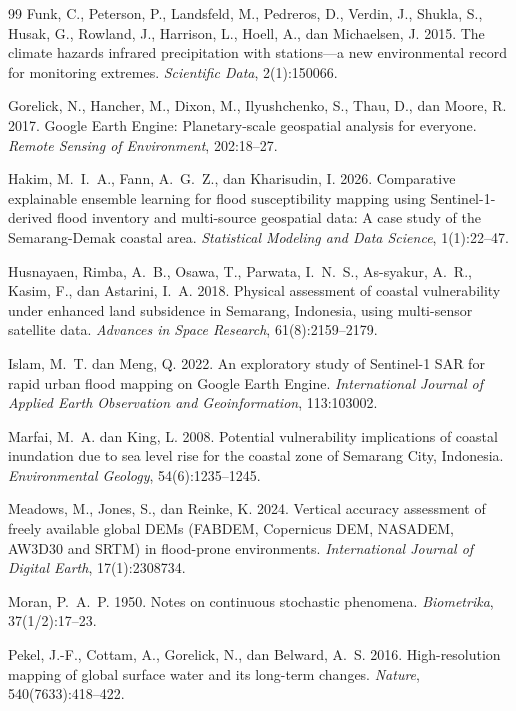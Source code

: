\documentclass[12pt,a4paper]{article}
\begin{document}
\begin{thebibliography}{99}
 Funk, C., Peterson, P., Landsfeld, M., Pedreros, D., Verdin, J., Shukla, S., Husak, G., Rowland, J., Harrison, L., Hoell, A., dan Michaelsen, J. 2015. The climate hazards infrared precipitation with stations---a new environmental record for monitoring extremes. \textit{Scientific Data}, 2(1):150066.

 Gorelick, N., Hancher, M., Dixon, M., Ilyushchenko, S., Thau, D., dan Moore, R. 2017. Google Earth Engine: Planetary-scale geospatial analysis for everyone. \textit{Remote Sensing of Environment}, 202:18--27.

 Hakim, M.~I.~A., Fann, A.~G.~Z., dan Kharisudin, I. 2026. Comparative explainable ensemble learning for flood susceptibility mapping using Sentinel-1-derived flood inventory and multi-source geospatial data: A case study of the Semarang-Demak coastal area. \textit{Statistical Modeling and Data Science}, 1(1):22--47.

 Husnayaen, Rimba, A.~B., Osawa, T., Parwata, I.~N.~S., As-syakur, A.~R., Kasim, F., dan Astarini, I.~A. 2018. Physical assessment of coastal vulnerability under enhanced land subsidence in Semarang, Indonesia, using multi-sensor satellite data. \textit{Advances in Space Research}, 61(8):2159--2179.

 Islam, M.~T. dan Meng, Q. 2022. An exploratory study of Sentinel-1 SAR for rapid urban flood mapping on Google Earth Engine. \textit{International Journal of Applied Earth Observation and Geoinformation}, 113:103002.

 Marfai, M.~A. dan King, L. 2008. Potential vulnerability implications of coastal inundation due to sea level rise for the coastal zone of Semarang City, Indonesia. \textit{Environmental Geology}, 54(6):1235--1245.

 Meadows, M., Jones, S., dan Reinke, K. 2024. Vertical accuracy assessment of freely available global DEMs (FABDEM, Copernicus DEM, NASADEM, AW3D30 and SRTM) in flood-prone environments. \textit{International Journal of Digital Earth}, 17(1):2308734.

 Moran, P.~A.~P. 1950. Notes on continuous stochastic phenomena. \textit{Biometrika}, 37(1/2):17--23.

 Pekel, J.-F., Cottam, A., Gorelick, N., dan Belward, A.~S. 2016. High-resolution mapping of global surface water and its long-term changes. \textit{Nature}, 540(7633):418--422.


\end{thebibliography}
\end{document}
